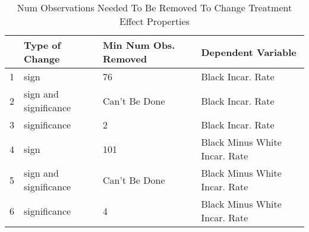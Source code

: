\begin{table}[ht]
\centering
\begin{tabular}{rlll}
  \hline
 & Type of Change & Min Num Obs. Removed & Dependent Variable \\ 
  \hline
1 & sign & 76 & Black Incar. Rate \\ 
  2 & sign and significance & Can't Be Done & Black Incar. Rate \\ 
  3 & significance & 2 & Black Incar. Rate \\ 
  4 & sign & 101 & Black Minus White Incar. Rate \\ 
  5 & sign and significance & Can't Be Done & Black Minus White Incar. Rate \\ 
  6 & significance & 4 & Black Minus White Incar. Rate \\ 
   \hline
\end{tabular}
\caption{Num Observations Needed To Be Removed To Change Treatment Effect Properties} 
\label{table_mip}
\end{table}
